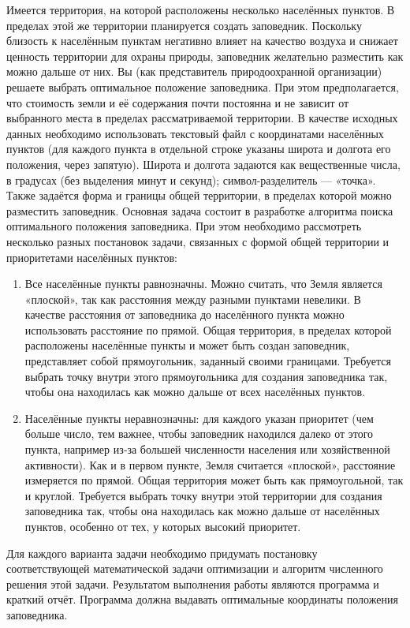 \documentclass{article}
\begin{document}
Имеется территория, на которой расположены несколько населённых пунктов. В пределах этой же территории планируется создать заповедник. Поскольку близость к населённым пунктам негативно влияет на качество воздуха и снижает ценность территории для охраны природы, заповедник желательно разместить как можно дальше от них. Вы (как представитель природоохранной организации) решаете выбрать оптимальное положение заповедника. При этом предполагается, что стоимость земли и её содержания почти постоянна и не зависит от выбранного места в пределах рассматриваемой территории. В качестве исходных данных необходимо использовать текстовый файл с координатами населённых пунктов (для каждого пункта в отдельной строке указаны широта и долгота его положения, через запятую). Широта и долгота задаются как вещественные числа, в градусах (без выделения минут и секунд); символ-разделитель — «точка». Также задаётся форма и границы общей территории, в пределах которой можно разместить заповедник. Основная задача состоит в разработке алгоритма поиска оптимального положения заповедника. При этом необходимо рассмотреть несколько разных постановок задачи, связанных с формой общей территории и приоритетами населённых пунктов: 
\begin{enumerate}
    \item Все населённые пункты равнозначны. Можно считать, что Земля является «плоской», так как расстояния между разными пунктами невелики. В качестве расстояния от заповедника до населённого пункта можно использовать расстояние по прямой. Общая территория, в пределах которой расположены населённые пункты и может быть создан заповедник, представляет собой прямоугольник, заданный своими границами. Требуется выбрать точку внутри этого прямоугольника для создания заповедника так, чтобы она находилась как можно дальше от всех населённых пунктов.
    \item Населённые пункты неравнозначны: для каждого указан приоритет (чем больше число, тем важнее, чтобы заповедник находился далеко от этого пункта, например из‑за большей численности населения или хозяйственной активности). Как и в первом пункте, Земля считается «плоской», расстояние измеряется по прямой. Общая территория может быть как прямоугольной, так и круглой. Требуется выбрать точку внутри этой территории для создания заповедника так, чтобы она находилась как можно дальше от населённых пунктов, особенно от тех, у которых высокий приоритет.
\end{enumerate}
Для каждого варианта задачи необходимо придумать постановку соответствующей математической задачи оптимизации и алгоритм численного решения этой задачи. Результатом выполнения работы являются программа и краткий отчёт. Программа должна выдавать оптимальные координаты положения заповедника.
\end{document}

